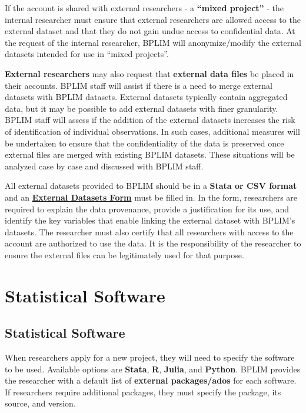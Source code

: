 \documentclass[
  a4paper,
  DIV=11,
  numbers=noendperiod]{scrartcl}
\begin{document}
If the account is shared with external researchers - a \textbf{``mixed
project''} - the internal researcher must ensure that external
researchers are allowed access to the external dataset and that they do
not gain undue access to confidential data. At the request of the
internal researcher, BPLIM will anonymize/modify the external datasets
intended for use in ``mixed projects''.

\textbf{External researchers} may also request that \textbf{external
data files} be placed in their accounts. BPLIM staff will assist if
there is a need to merge external datasets with BPLIM datasets. External
datasets typically contain aggregated data, but it may be possible to
add external datasets with finer granularity. BPLIM staff will assess if
the addition of the external datasets increases the risk of
identification of individual observations. In such cases, additional
measures will be undertaken to ensure that the confidentiality of the
data is preserved once external files are merged with existing BPLIM
datasets. These situations will be analyzed case by case and discussed
with BPLIM staff.

All external datasets provided to BPLIM should be in a \textbf{Stata or
CSV format} and an
\href{https://msites-dee-bplim-prd.azurewebsites.net/sites/default/files/external_dataset_application_vf.pdf}{\textbf{External
Datasets Form}} must be filled in. In the form, researchers are required
to explain the data provenance, provide a justification for its use, and
identify the key variables that enable linking the external dataset with
BPLIM's datasets. The researcher must also certify that all researchers
with access to the account are authorized to use the data. It is the
responsibility of the researcher to ensure the external files can be
legitimately used for that purpose.

\hypertarget{statistical-software}{%
\section{Statistical Software}\label{statistical-software}}

\hypertarget{statistical-software-1}{%
\subsection{Statistical Software}\label{statistical-software-1}}

When researchers apply for a new project, they will need to specify the
software to be used. Available options are \textbf{Stata}, \textbf{R},
\textbf{Julia}, and \textbf{Python}. BPLIM provides the researcher with
a default list of \textbf{external packages/ados} for each software. If
researchers require additional packages, they must specify the package,
its source, and version.
\end{document}
